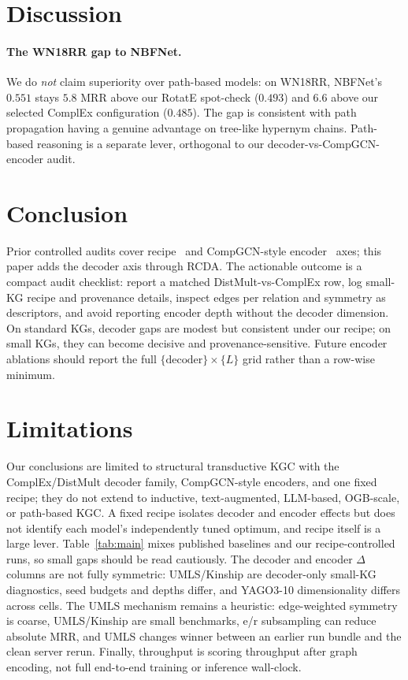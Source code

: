 \documentclass[runningheads]{llncs}
\newcommand{\ours}{\textsc{RCDA}\xspace}
\begin{document}
\section{Discussion}
\label{sec:discussion}

\paragraph{The WN18RR gap to NBFNet.}
\label{sec:wn18rr-gap}
We do \emph{not} claim superiority over path-based models: on WN18RR, NBFNet's $0.551$ stays $5.8$ MRR above our RotatE spot-check ($0.493$) and $6.6$ above our selected ComplEx configuration ($0.485$). The gap is consistent with path propagation having a genuine advantage on tree-like hypernym chains. Path-based reasoning is a separate lever, orthogonal to our decoder-vs-CompGCN-encoder audit.

\section{Conclusion}

Prior controlled audits cover recipe~\cite{ruffinelli2020olderboys} and CompGCN-style encoder~\cite{zhang2022rethinking} axes; this paper adds the decoder axis through \ours. The actionable outcome is a compact audit checklist: report a matched DistMult-vs-ComplEx row, log small-KG recipe and provenance details, inspect edges per relation and symmetry as descriptors, and avoid reporting encoder depth without the decoder dimension. On standard KGs, decoder gaps are modest but consistent under our recipe; on small KGs, they can become decisive and provenance-sensitive. Future encoder ablations should report the full $\{\mathrm{decoder}\} \times \{L\}$ grid rather than a row-wise minimum.


\section*{Limitations}
\label{sec:limitations}

Our conclusions are limited to structural transductive KGC with the ComplEx/DistMult decoder family, CompGCN-style encoders, and one fixed recipe; they do not extend to inductive, text-augmented, LLM-based, OGB-scale, or path-based KGC. A fixed recipe isolates decoder and encoder effects but does not identify each model's independently tuned optimum, and recipe itself is a large lever. Table~\ref{tab:main} mixes published baselines and our recipe-controlled runs, so small gaps should be read cautiously. The decoder and encoder $\Delta$ columns are not fully symmetric: UMLS/Kinship are decoder-only small-KG diagnostics, seed budgets and depths differ, and YAGO3-10 dimensionality differs across cells. The UMLS mechanism remains a heuristic: edge-weighted symmetry is coarse, UMLS/Kinship are small benchmarks, e/r subsampling can reduce absolute MRR, and UMLS changes winner between an earlier run bundle and the clean server rerun. Finally, throughput is scoring throughput after graph encoding, not full end-to-end training or inference wall-clock.
\end{document}
